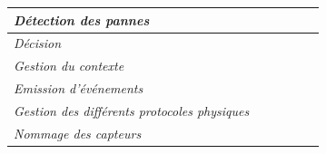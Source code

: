 \begin{table}[h!]
\begin{tabular}{|l|c|c|c|c|c|}
		\textit{Détection des pannes}                        &                                                                                  & \checkmark                                                                    &                                                                            &                                                                               &                                                                        \\ \hline
		\textit{Décision}                                    &                                                                                  &                                                                               &                                                                            &                                                                               &                                                                        \\ \hline
		\textit{Gestion du contexte}                         &                                                                                  &                                                                               & \checkmark                                                                 & \checkmark                                                                    &                                                                        \\ \hline
		\textit{Emission d'événements}                       &                                                                                  &                                                                               & \checkmark                                                                 & \checkmark                                                                    &                                                                        \\ \hline
		\textit{Gestion des différents protocoles physiques} &                                                                                  &                                                                               &                                                                            &                                                                               & \checkmark                                                             \\ \hline
		\textit{Nommage des capteurs}                        &                                                                                  & \checkmark                                                                    &                                                                            &                                                                               &                                                                        \\ \hline

\end{tabular}
\end{table}
